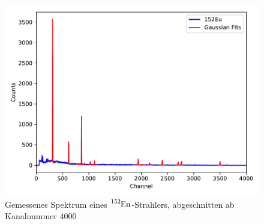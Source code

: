 \begin{figure}[H]
  \centering
  \includegraphics[scale=0.6]{content/plot1.pdf}
  \caption{Gemessenes Spektrum eines $\ce{^{152}Eu}$-Strahlers, abgeschnitten ab Kanalnummer $\num{4000}$}
  \label{fig:plot1}
\end{figure}


